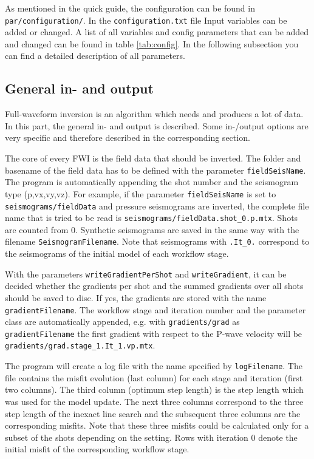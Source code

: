 \documentclass[pdftex,a4paper,parskip,listof=totoc,bibliography=totoc,onehalfspacing,12pt]{scrreprt}
\newcommand{\shellcmd}[1]{\indent\indent\texttt{#1}}	%
\begin{document}
As mentioned in the quick guide, the configuration can be found in \shellcmd{par/configuration/}. In the \shellcmd{configuration.txt} file Input variables can be added or changed. A list of all variables and config parameters that can be added and changed can be found in table \ref{tab:config}. In the following subsection you can find a detailed description of all parameters.

\subsection{General in- and output}

Full-waveform inversion is an algorithm which needs and produces a lot of data. In this part, the general in- and output is described. Some in-/output options are very specific and therefore described in the corresponding section.

The core of every FWI is the field data that should be inverted. The folder and basename of the field data has to be defined with the parameter \verb+fieldSeisName+. The program is automatically appending the shot number and the seismogram type (p,vx,vy,vz). For example, if the parameter \verb+fieldSeisName+ is set to \verb+seismograms/fieldData+ and pressure seismograms are inverted, the complete file name that is tried to be read is \verb+seismograms/fieldData.shot_0.p.mtx+. Shots are counted from 0.
Synthetic seismograms are saved in the same way with the filename \verb+SeismogramFilename+. Note that seismograms with \verb+.It_0.+ correspond to the seismograms of the initial model of each workflow stage.

With the parameters \verb+writeGradientPerShot+ and \verb+writeGradient+, it can be decided whether the gradients per shot and the summed gradients over all shots should be saved to disc. If yes, the gradients are stored with the name \verb+gradientFilename+. The workflow stage and iteration number and the parameter class are automatically appended, e.g. with \verb+gradients/grad+ as \verb+gradientFilename+ the first gradient with respect to the P-wave velocity will be \verb+gradients/grad.stage_1.It_1.vp.mtx+.

The program will create a log file with the name specified by \verb+logFilename+. The file contains the misfit evolution (last column) for each stage and iteration (first two columns). The third column (optimum step length) is the step length which was used for the model update. The next three columns correspond to the three step length of the inexact line search and the subsequent three columns are the corresponding misfits. Note that these three misfits could be calculated only for a subset of the shots depending on the setting. Rows with iteration 0 denote the initial misfit of the corresponding workflow stage.
\end{document}
